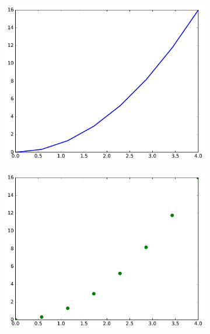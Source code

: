 \begin{figure}[H] %
\captionsetup[subfigure]{justification=centering}
\centering
\begin{subfigure}{.325\textwidth}
    \centering
    \includegraphics[width=\linewidth]{figures/line_vs_scatter_line.pdf}
\end{subfigure}
%
\begin{subfigure}{.325\textwidth}
    \centering
    \includegraphics[width=\linewidth]{figures/line_vs_scatter_scat.pdf}
\end{subfigure}
%
\begin{subfigure}{.325\textwidth}
    \centering

\end{subfigure}
\end{figure}
